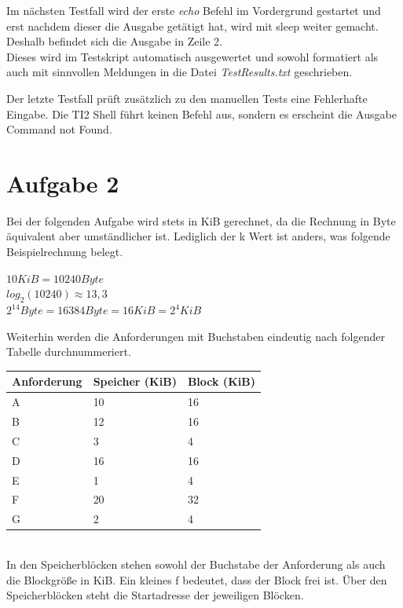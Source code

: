 \documentclass{ti2}
\begin{document}
Im nächsten Testfall wird der erste \textit{echo} Befehl im Vordergrund gestartet und erst nachdem dieser die Ausgabe getätigt hat, wird mit sleep weiter gemacht. Deshalb befindet sich die Ausgabe in Zeile 2. \\ 
Dieses wird im Testskript automatisch ausgewertet und sowohl formatiert als auch mit sinnvollen Meldungen in die Datei \textit{TestResults.txt} geschrieben. 

Der letzte Testfall prüft zusätzlich zu den manuellen Tests eine Fehlerhafte Eingabe. Die TI2 Shell führt keinen Befehl aus, sondern es erscheint die Ausgabe \glqq Command not Found\grqq .
\section*{Aufgabe 2} 
Bei der folgenden Aufgabe wird stets in KiB gerechnet, da die Rechnung in Byte äquivalent aber umständlicher ist. Lediglich der k Wert ist anders, was folgende Beispielrechnung belegt. 
\begin{center}
$10 KiB = 10240 Byte$\\
$log_2(10240) \approx 13,3 $\\
$2^{14} Byte = 16384 Byte = 16 KiB = 2^4 KiB$\\
\end{center} 
Weiterhin werden die Anforderungen mit Buchstaben eindeutig nach folgender Tabelle durchnummeriert.
\begin{table}[htbp]
\begin{adjustbox}{max width=\textwidth}
\begin{tabular}{|l|l|l|}
\hline
Anforderung & Speicher (KiB) & Block (KiB) \\ \hline
A  & 10 & 16 \\ \hline
B & 12 & 16 \\ \hline
C & 3 & 4 \\ \hline
D & 16 & 16 \\ \hline
E & 1 & 4 \\ \hline
F & 20 & 32 \\ \hline
G & 2 & 4 \\ \hline
\end{tabular}
\end{adjustbox}
\end{table}
\\In den Speicherblöcken stehen sowohl der Buchstabe der Anforderung als auch die Blockgröße in KiB. Ein kleines f bedeutet, dass der Block frei ist. Über den Speicherblöcken steht die Startadresse der jeweiligen Blöcken. 
\end{document}
